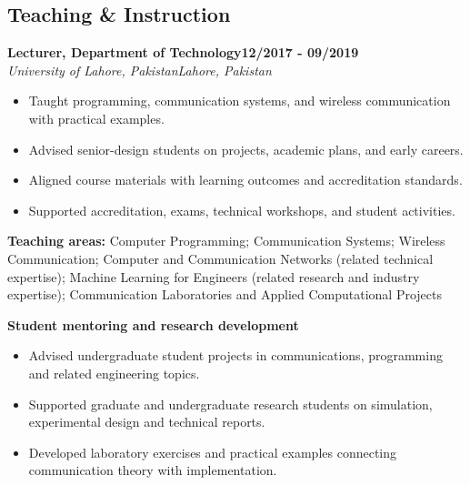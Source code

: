 \documentclass[9pt,letterpaper]{extarticle}
\newcommand{\role}[4]{%
  \Needspace{4\baselineskip}\textbf{#1}\hfill\textbf{#2}\\[-1pt]
  \textit{#3}\hfill\textit{#4}\par}
\begin{document}
\subsection{Teaching \& Instruction}
\role{Lecturer, Department of Technology}{12/2017 - 09/2019}{University of Lahore, Pakistan}{Lahore, Pakistan}
\begin{itemize}
\item Taught programming, communication systems, and wireless communication with practical examples.
\item Advised senior-design students on projects, academic plans, and early careers.
\item Aligned course materials with learning outcomes and accreditation standards.
\item Supported accreditation, exams, technical workshops, and student activities.
\end{itemize}
\vspace{1pt}
{\small\textbf{Teaching areas:} Computer Programming; Communication Systems; Wireless Communication; Computer and Communication Networks (related technical expertise); Machine Learning for Engineers (related research and industry expertise); Communication Laboratories and Applied Computational Projects}\par
{}\noindent\textbf{Student mentoring and research development}\par
\begin{itemize}
\item Advised undergraduate student projects in communications, programming and related engineering topics.
\item Supported graduate and undergraduate research students on simulation, experimental design and technical reports.
\item Developed laboratory exercises and practical examples connecting communication theory with implementation.
\end{itemize}
\end{document}
